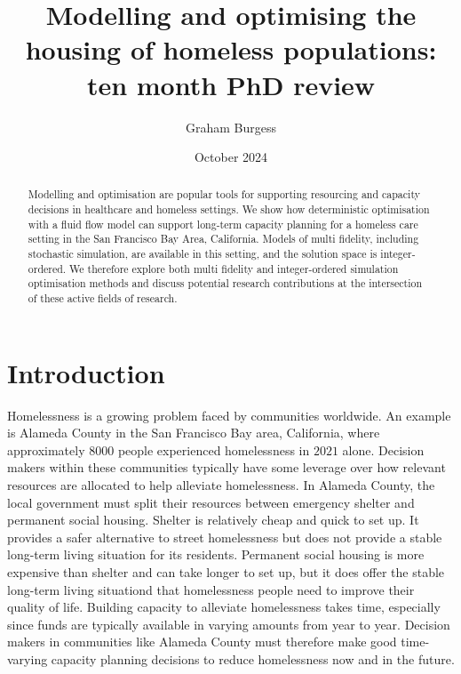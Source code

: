 \documentclass{article}
\title{Modelling and optimising the housing of homeless populations: ten month PhD review}
\author{Graham Burgess}
\date{October 2024}
\begin{document}
\maketitle

\begin{abstract}
Modelling and optimisation are popular tools for supporting resourcing and capacity decisions in healthcare and homeless settings. We show how deterministic optimisation with a fluid flow model can support long-term capacity planning for a homeless care setting in the San Francisco Bay Area, California. Models of multi fidelity, including stochastic simulation, are available in this setting, and the solution space is integer-ordered. We therefore explore both multi fidelity and integer-ordered simulation optimisation methods and discuss potential research contributions at the intersection of these active fields of research.
\end{abstract}

\section{Introduction}

Homelessness is a growing problem faced by communities worldwide. An example is Alameda County in the San Francisco Bay area, California, where approximately $8000$ people experienced homelessness in $2021$ alone. Decision makers within these communities typically have some leverage over how relevant resources are allocated to help alleviate homelessness. In Alameda County, the local government must split their resources between emergency shelter and permanent social housing. Shelter is relatively cheap and quick to set up. It provides a safer alternative to street homelessness but does not provide a stable long-term living situation for its residents. Permanent social housing is more expensive than shelter and can take longer to set up, but it does offer the stable long-term living situationd that homelessness people need to improve their quality of life. Building capacity to alleviate homelessness takes time, especially since funds are typically available in varying amounts from year to year. Decision makers in communities like Alameda County must therefore make good time-varying capacity planning decisions to reduce homelessness now and in the future. \newline
\end{document}
